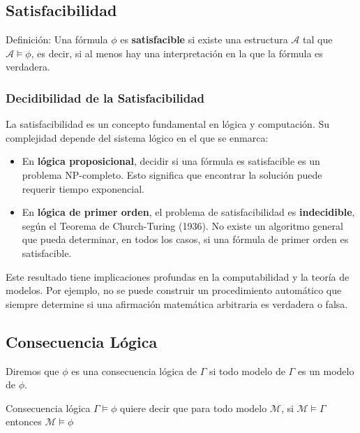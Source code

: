 \subsection{Satisfacibilidad}
\begin{definitionblock}{Definición:}
Una fórmula $\phi$ es \textbf{satisfacible} si existe una estructura $\mathcal{A}$ tal que $\mathcal{A} \models \phi$, es decir, si al menos hay una interpretación en la que la fórmula es verdadera.
\end{definitionblock}

\subsubsection{Decidibilidad de la Satisfacibilidad}
La satisfacibilidad es un concepto fundamental en lógica y computación. Su complejidad depende del sistema lógico en el que se enmarca:

\begin{itemize}
    \item En \textbf{lógica proposicional}, decidir si una fórmula es satisfacible es un problema NP-completo. Esto significa que encontrar la solución puede requerir tiempo exponencial.
    \item En \textbf{lógica de primer orden}, el problema de satisfacibilidad es \textbf{indecidible}, según el Teorema de Church-Turing (1936). No existe un algoritmo general que pueda determinar, en todos los casos, si una fórmula de primer orden es satisfacible.
\end{itemize}

Este resultado tiene implicaciones profundas en la computabilidad y la teoría de modelos. Por ejemplo, no se puede construir un procedimiento automático que siempre determine si una afirmación matemática arbitraria es verdadera o falsa.

\subsection{Consecuencia Lógica}

Diremos que $\phi$ es una consecuencia lógica de $\Gamma$ si todo modelo de $\Gamma$ es un modelo de  $\phi$.

\begin{definitionblock}{Consecuencia lógica}
$\Gamma \models \phi$ quiere decir que para todo modelo $\mathcal{M}$, si  $\mathcal{M} \models \Gamma$ entonces  $\mathcal{M} \models \phi$
\end{definitionblock}

